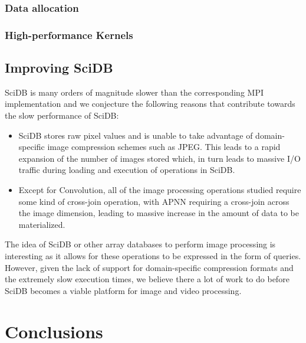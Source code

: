 \documentclass[tog]{acmsiggraph}
\begin{document}
\subsubsection{Data allocation}

\subsubsection{High-performance Kernels}

\subsection{Improving SciDB}
SciDB is many orders of magnitude slower than the corresponding MPI
implementation and we conjecture the following reasons that contribute towards
the slow performance of SciDB:

\begin{itemize}
\item SciDB stores raw pixel values and is unable to take advantage of
domain-specific image compression schemes such as JPEG. This leads to a rapid
expansion of the number of images stored which, in turn leads to massive I/O
traffic during loading and execution of operations in SciDB.
\item Except for Convolution, all of the image processing operations studied
require some kind of cross-join operation, with APNN requiring a cross-join
across the image dimension, leading to massive increase in the amount of data
to be materialized.
\end{itemize}

The idea of SciDB or other array databases to perform image processing is
interesting as it allows for these operations to be expressed in the form of
queries. However, given the lack of support for domain-specific compression
formats and the extremely slow execution times, we believe there a lot of work
to do before SciDB becomes a viable platform for image and video processing.

\section{Conclusions}



\nocite{*}

\end{document}
